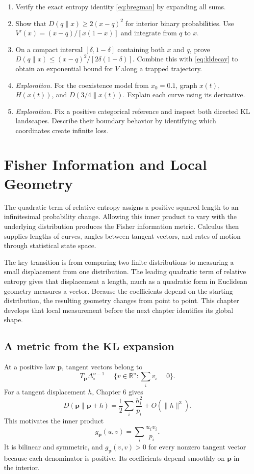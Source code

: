 \documentclass[11pt,oneside,openany]{book}
\theoremstyle{definition}
\theoremstyle{remark}
\newenvironment{exercises}{\begin{enumerate}[label=\thechapter.\arabic*,ref=\thechapter.\arabic*,leftmargin=2.8em,itemsep=6pt]}{\end{enumerate}}
\newcommand{\R}{\mathbb{R}}
\newcommand{\p}{\mathbf{p}}
\numberwithin{equation}{chapter}
\begin{document}
\begin{exercises}
\item Verify the exact entropy identity \eqref{eq:bregman} by expanding all sums.
\item Show that $D(q\|x)\geq2(x-q)^2$ for interior binary probabilities. Use $V'(x)=(x-q)/[x(1-x)]$ and integrate from $q$ to $x$.
\item On a compact interval $[\delta,1-\delta]$ containing both $x$ and $q$, prove $D(q\|x)\leq(x-q)^2/[2\delta(1-\delta)]$. Combine this with \eqref{eq:kldecay} to obtain an exponential bound for $V$ along a trapped trajectory.
\item \emph{Exploration.} For the coexistence model from $x_0=0.1$, graph $x(t)$, $H(x(t))$, and $D(3/4\|x(t))$. Explain each curve using its derivative.
\item \emph{Exploration.} Fix a positive categorical reference and inspect both directed KL landscapes. Describe their boundary behavior by identifying which coordinates create infinite loss.
\end{exercises}

\chapter{Fisher Information and Local Geometry}
\label{ch:fisher}

The quadratic term of relative entropy assigns a positive squared length to an infinitesimal probability change. Allowing this inner product to vary with the underlying distribution produces the Fisher information metric. Calculus then supplies lengths of curves, angles between tangent vectors, and rates of motion through statistical state space.

The key transition is from comparing two finite distributions to measuring a small displacement from one distribution. The leading quadratic term of relative entropy gives that displacement a length, much as a quadratic form in Euclidean geometry measures a vector. Because the coefficients depend on the starting distribution, the resulting geometry changes from point to point. This chapter develops that local measurement before the next chapter identifies its global shape.

\section{A metric from the KL expansion}
At a positive law $\p$, tangent vectors belong to
\[
T_\p\Delta^{n-1}_{\!\circ}=\{v\in\R^n:\sum_i v_i=0\}.
\]
For a tangent displacement $h$, Chapter 6 gives
\[
D(\p\|\p+h)=\frac12\sum_i\frac{h_i^2}{p_i}+O(\|h\|^3).
\]
This motivates the inner product
\begin{equation}\label{eq:fishermetric}
\boxed{g_\p(u,v)=\sum_i\frac{u_iv_i}{p_i}.}
\end{equation}
It is bilinear and symmetric, and $g_\p(v,v)>0$ for every nonzero tangent vector because each denominator is positive. Its coefficients depend smoothly on $\p$ in the interior.
\end{document}
